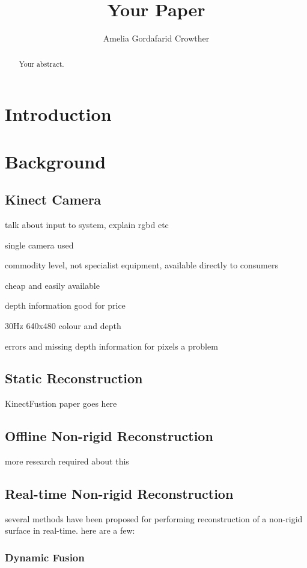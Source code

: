 \documentclass[a4paper]{article}
\title{Your Paper}
\author{Amelia Gordafarid Crowther}
\begin{document}
\begin{abstract}
Your abstract.
\end{abstract}

\section{Introduction}

\section{Background}

\subsection{Kinect Camera}

talk about input to system, explain rgbd etc

single camera used

commodity level, not specialist equipment, available directly to consumers

cheap and easily available

depth information good for price

30Hz 640x480 colour and depth

errors and missing depth information for pixels a problem

\subsection{Static Reconstruction}

KinectFustion paper goes here

\subsection{Offline Non-rigid Reconstruction}

more research required about this

\subsection{Real-time Non-rigid Reconstruction}

several methods have been proposed for performing reconstruction of a non-rigid surface in real-time.
here are a few:

\subsubsection{Dynamic Fusion}
\end{document}
